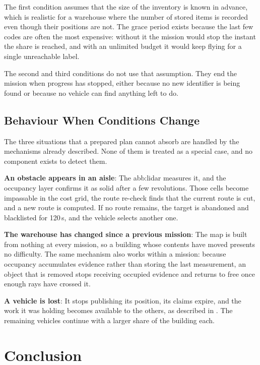 \FloatBarrier

The first condition assumes that the size of the inventory is known in advance,
which is realistic for a warehouse where the number of stored items is recorded
even though their positions are not. The grace period exists because the last few
codes are often the most expensive: without it the mission would stop the instant
the share is reached, and with an unlimited budget it would keep flying for a
single unreachable label.

The second and third conditions do not use that assumption. They end the mission
when progress has stopped, either because no new identifier is being found or
because no vehicle can find anything left to do.

\subsection{Behaviour When Conditions Change}%
\label{subsec:sys:change}

The three situations that a prepared plan cannot absorb are handled by the
mechanisms already described. None of them is treated as a special case, and no
component exists to detect them.

\textbf{An obstacle appears in an aisle}: The \gls{abb:lidar} measures it, and the
occupancy layer confirms it as solid after a few revolutions. Those cells become
impassable in the cost grid, the route re-check finds that the current route is
cut, and a new route is computed. If no route remains, the target is abandoned
and blacklisted for 120\,s, and the vehicle selects another one.

\textbf{The warehouse has changed since a previous mission}: The map is built from
nothing at every mission, so a building whose contents have moved presents no
difficulty. The same mechanism also works within a mission: because occupancy
accumulates evidence rather than storing the last measurement, an object that is
removed stops receiving occupied evidence and returns to free once enough rays
have crossed it.

\textbf{A vehicle is lost}: It stops publishing its position, its claims expire,
and the work it was holding becomes available to the others, as described in
. The remaining vehicles continue with a larger share of the
building each.

\section{Conclusion}%
\label{sec:sys:conclusion}

